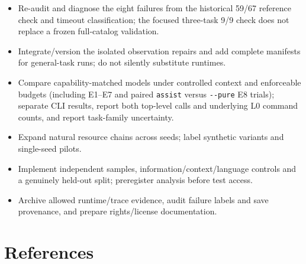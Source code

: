 \documentclass[11pt,a4paper]{article}
\begin{document}
\begin{itemize}
\item Re-audit and diagnose the eight failures from the historical 59/67 reference check and timeout classification; the focused three-task 9/9 check does not replace a frozen full-catalog validation.
\item Integrate/version the isolated observation repairs and add complete manifests for general-task runs; do not silently substitute runtimes.
\item Compare capability-matched models under controlled context and enforceable budgets (including E1--E7 and paired \texttt{assist} versus \texttt{-\allowbreak{}-\allowbreak{}pure} E8 trials); separate CLI results, report both top-level calls and underlying L0 command counts, and report task-family uncertainty.
\item Expand natural resource chains across seeds; label synthetic variants and single-seed pilots.
\item Implement independent samples, information/context/language controls and a genuinely held-out split; preregister analysis before test access.
\item Archive allowed runtime/trace evidence, audit failure labels and save provenance, and prepare rights/license documentation.

\end{itemize}
\section*{\texorpdfstring{References}{References}}
\end{document}
